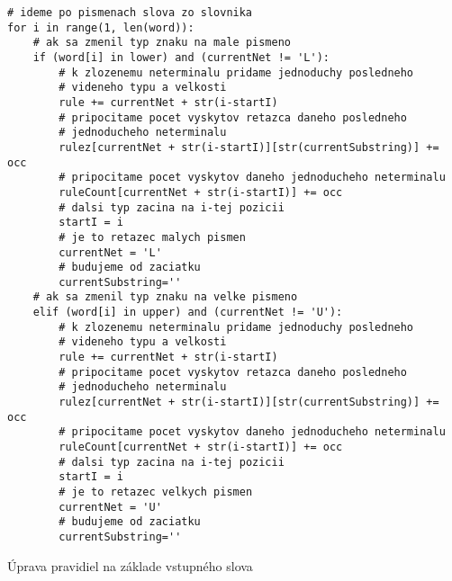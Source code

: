 \begin{listing}
\begin{verbatim}
# ideme po pismenach slova zo slovnika
for i in range(1, len(word)):
	# ak sa zmenil typ znaku na male pismeno
	if (word[i] in lower) and (currentNet != 'L'):
		# k zlozenemu neterminalu pridame jednoduchy posledneho 
		# videneho typu a velkosti
		rule += currentNet + str(i-startI)
		# pripocitame pocet vyskytov retazca daneho posledneho
		# jednoducheho neterminalu
		rulez[currentNet + str(i-startI)][str(currentSubstring)] += occ
		# pripocitame pocet vyskytov daneho jednoducheho neterminalu
		ruleCount[currentNet + str(i-startI)] += occ
		# dalsi typ zacina na i-tej pozicii
		startI = i
		# je to retazec malych pismen
		currentNet = 'L'
		# budujeme od zaciatku
		currentSubstring=''
	# ak sa zmenil typ znaku na velke pismeno
	elif (word[i] in upper) and (currentNet != 'U'):
		# k zlozenemu neterminalu pridame jednoduchy posledneho 
		# videneho typu a velkosti
		rule += currentNet + str(i-startI)
		# pripocitame pocet vyskytov retazca daneho posledneho
		# jednoducheho neterminalu
		rulez[currentNet + str(i-startI)][str(currentSubstring)] += occ
		# pripocitame pocet vyskytov daneho jednoducheho neterminalu
		ruleCount[currentNet + str(i-startI)] += occ
		# dalsi typ zacina na i-tej pozicii
		startI = i
		# je to retazec velkych pismen
		currentNet = 'U'
		# budujeme od zaciatku
		currentSubstring=''
\end{verbatim}
\caption{Úprava pravidiel na základe vstupného slova}
\label{lst:grammar1}
\end{listing}
